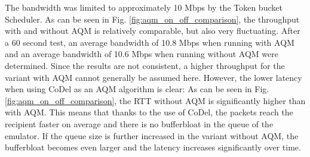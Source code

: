 The bandwidth was limited to approximately 10 Mbps by the Token bucket Scheduler. As can be seen in Fig. \ref{fig:aqm_on_off_comparison}, the throughput with and without AQM is relatively comparable, but also very fluctuating. After a 60 second test, an average bandwidth of 10.8 Mbps when running with AQM and an average bandwidth of 10.6 Mbps when running without AQM were determined.
Since the results are not consistent, a higher throughput for the variant with AQM cannot generally be assumed here. \newline
However, the lower latency when using CoDel as an AQM algorithm is clear: As can be seen in Fig. \ref{fig:aqm_on_off_comparison}, the RTT without AQM is significantly higher than with AQM. This means that thanks to the use of CoDel, the packets reach the recipient faster on average and there is no bufferbloat in the queue of the emulator. If the queue size is further increased in the variant without AQM, the bufferbloat becomes even larger and the latency increases significantly over time.